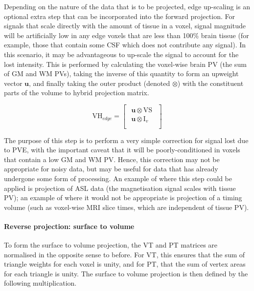 \documentclass[review]{elsarticle}
\renewcommand{\vec}[1]{\mathbf{#1}}
\begin{document}
Depending on the nature of the data that is to be projected, edge up-scaling is an optional extra step that can be incorporated into the forward projection. For signals that scale directly with the amount of tissue in a voxel, signal magnitude will be artificially low in any edge voxels that are less than 100\% brain tissue (for example, those that contain some CSF which does not contribute any signal). In this scenario, it may be advantageous to up-scale the signal to account for the lost intensity. This is performed by calculating the voxel-wise brain PV (the sum of GM and WM PVs), taking the inverse of this quantity to form an upweight vector $\vec{u}$, and finally taking the outer product (denoted $\otimes$) with the constituent parts of the volume to hybrid projection matrix. 

\begin{equation}
\mathrm{VH}_{edge} =  \begin{bmatrix}
    \begin{array}{c}
  \vec{u} \otimes \mathrm{VS}  \\
  \hline
  \vec{u} \otimes \mathrm{I}_v \\
    \end{array}
  \end{bmatrix}
\end{equation}

The purpose of this step is to perform a very simple correction for signal lost due to PVE, with the important caveat that it will be poorly-conditioned in voxels that contain a low GM and WM PV. Hence, this correction may not be appropriate for noisy data, but may be useful for data that has already undergone some form of processing. An example of where this step could be applied is projection of ASL data (the magnetisation signal scales with tissue PV); an example of where it would not be appropriate is projection of a timing volume (such as voxel-wise MRI slice times, which are independent of tissue PV). 

\paragraph{Reverse projection: surface to volume}

To form the surface to volume projection, the VT and PT matrices are normalised in the opposite sense to before. For VT, this ensures that the sum of triangle weights for each voxel is unity, and for PT, that the sum of vertex areas for each triangle is unity. The surface to volume projection is then defined by the following multiplication.  
\end{document}
